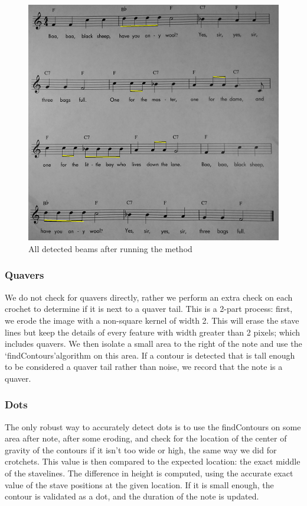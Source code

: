 \begin{figure}[h!]
    \centering
    \includegraphics[width=1\textwidth]{./assets/beamsdetected.png}
    \caption{All detected beams after running the method}
    \label{image:beamsdetected}
\end{figure}

\subsubsection{Quavers}

We do not check for quavers directly, rather we perform an extra check on each crochet to determine if it is next to a quaver tail. This is a 2-part process: first, we erode the image with a non-square kernel of width 2. This will erase the stave lines but keep the details of every feature with width greater than 2 pixels; which includes
quavers. We then isolate a small area to the right of the note and use the \lq findContours\rq  algorithm on this area. If a contour is detected that is tall enough to be considered a quaver tail rather than noise, we record that the note is a quaver.

\subsubsection{Dots}

The only robust way to accurately detect dots is to use the findContours on some area after note, after some eroding, and check for the location of the center of gravity of the contours if it isn't too wide or high, the same way we did for crotchets. This value is then compared to the expected location: the exact middle of
the stavelines. The difference in height is computed, using the accurate exact value of the stave positions at the given location. If it is small enough, the contour is validated as a dot, and the duration of the note is updated.

